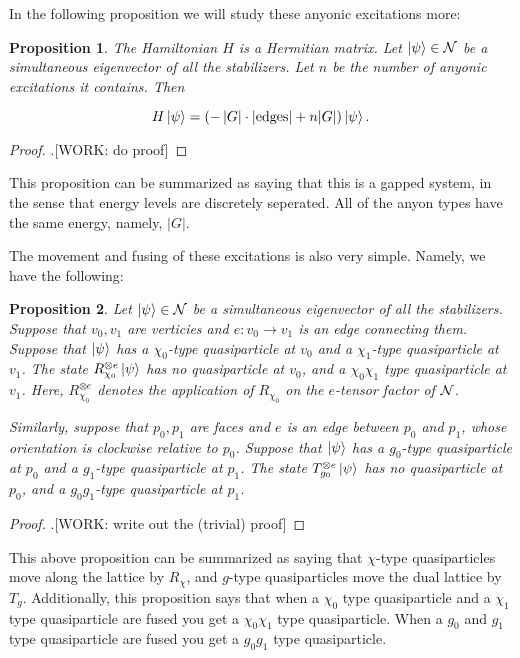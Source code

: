 \documentclass{article}
\newtheorem{proposition}{Proposition}
\theoremstyle{definition}
\numberwithin{figure}{section}
\begin{document}
In the following proposition we will study these anyonic excitations more:

\begin{proposition} The Hamiltonian $H$ is a Hermitian matrix. Let $\left|\psi\right>\in\mathcal{N}$ be a simultaneous eigenvector of all the stabilizers. Let $n$ be the number of anyonic excitations it contains. Then

$$H\left|\psi\right>=\left(-\left| G\right| \cdot |\text{edges}|+ n|G|\right)\left|\psi\right>.$$
\end{proposition}
\begin{proof}.[WORK: do proof]
\end{proof}

This proposition can be summarized as saying that this is a gapped system, in the sense that energy levels are discretely seperated. All of the anyon types have the same energy, namely, $|G|$.

The movement and fusing of these excitations is also very simple. Namely, we have the following:

\begin{proposition} Let $\left|\psi\right>\in \mathcal{N}$ be a simultaneous eigenvector of all the stabilizers. Suppose that $v_0,v_1$ are verticies and $e:v_0\to v_1$ is an edge connecting them. Suppose that $\left|\psi\right>$ has a $\chi_0$-type quasiparticle at $v_0$ and a $\chi_1$-type quasiparticle at $v_1$. The state $R^{\otimes e}_{\chi_0}\left|\psi\right>$ has no quasiparticle at $v_0$, and a $\chi_0\chi_1$ type quasiparticle at $v_1$. Here, $R^{\otimes e}_{\chi_0}$ denotes the application of $R_{\chi_0}$ on the $e$-tensor factor of $\mathcal{N}$.

Similarly, suppose that $p_0,p_1$ are faces and $e$ is an edge between $p_0$ and $p_1$, whose orientation is clockwise relative to $p_0$. Suppose that $\left|\psi\right>$ has a $g_0$-type quasiparticle at $p_0$ and a $g_1$-type quasiparticle at $p_1$. The state $T_{g_0}^{\otimes e}\left|\psi\right>$ has no quasiparticle at $p_0$, and a $g_0g_1$-type quasiparticle at $p_1$.
\end{proposition}
\begin{proof}.[WORK: write out the (trivial) proof]
\end{proof}

This above proposition can be summarized as saying that $\chi$-type quasiparticles move along the lattice by $R_\chi$, and $g$-type quasiparticles move the dual lattice by $T_g$. Additionally, this proposition says that when a $\chi_0$ type quasiparticle and a $\chi_1$ type quasiparticle are fused you get a $\chi_0\chi_1$ type quasiparticle. When a $g_0$ and $g_1$ type quasiparticle are fused you get a $g_0g_1$ type quasiparticle.
\end{document}
